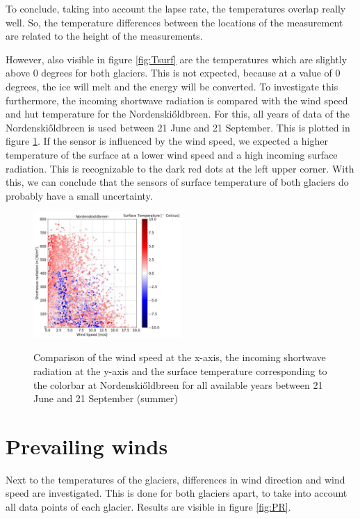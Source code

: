 \documentclass[11pt]{report}
\begin{document}
To conclude, taking into account the lapse rate, the temperatures overlap really well. So, the temperature differences between the locations of the measurement are related to the height of the measurements.

\newpage
However, also visible in figure \ref{fig:Tsurf} are the temperatures which are slightly above 0 degrees for both glaciers. This is not expected, because at a value of 0 degrees, the ice will melt and the energy will be converted. To investigate this furthermore, the incoming shortwave radiation is compared with the wind speed and hut temperature for the Nordenski\H{o}ldbreen. For this, all years of data of the Nordenski\H{o}ldbreen is used between 21 June and 21 September. This is plotted in figure \ref{fig:Thut}. If the sensor is influenced by the wind speed, we expected a higher temperature of the surface at a lower wind speed and a high incoming surface radiation. This is recognizable to the dark red dots at the left upper corner. With this, we can conclude that the sensors of surface temperature of both glaciers do probably have a small uncertainty.

\begin{figure}[h]
\centering{}
    \includegraphics[scale=0.5, width=0.5\textwidth]{Thut-Sin.jpg}
    \label{fig:Thut}
    \caption{Comparison of the wind speed at the x-axis, the incoming shortwave radiation at the y-axis and the surface temperature corresponding to the colorbar at Nordenski\H{o}ldbreen for all available years between 21 June and 21 September (summer) }
\end{figure}


\newpage
\section{Prevailing winds}\label{sec:katw}
Next to the temperatures of the glaciers, differences in wind direction and wind speed are investigated. This is done for both glaciers apart, to take into account all data points of each glacier. Results are visible in figure \ref{fig:PR}.
\end{document}

